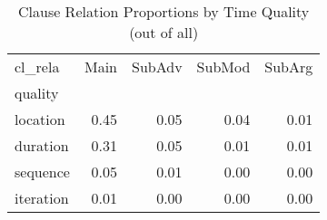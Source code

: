 \begin{table}[htbp!]
\centering
\caption{Clause Relation Proportions by Time Quality (out of all)}
\label{table:rela_prwhole}
\begin{tabular}{lrrrr}
\toprule
cl\_rela &  Main &  SubAdv &  SubMod &  SubArg \\
quality   &       &         &         &         \\
\midrule
location  &  0.45 &    0.05 &    0.04 &    0.01 \\
duration  &  0.31 &    0.05 &    0.01 &    0.01 \\
sequence  &  0.05 &    0.01 &    0.00 &    0.00 \\
iteration &  0.01 &    0.00 &    0.00 &    0.00 \\
\bottomrule
\end{tabular}
\end{table}
